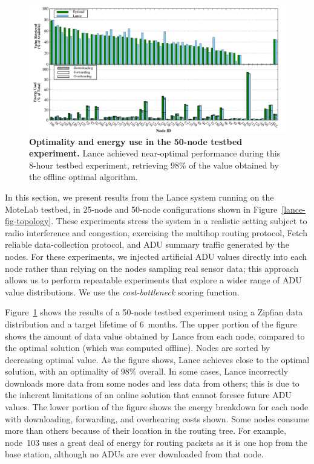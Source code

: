\begin{figure}[t]
\begin{center}
\includegraphics[width=1.0\hsize]{./4-lance/figs/big.pdf}
\end{center}

\caption{\textbf{Optimality and energy use in the 50-node testbed
experiment.} Lance achieved near-optimal performance during this 8-hour
testbed experiment, retrieving 98\% of the value obtained by the offline
optimal algorithm.}

\label{lance-fig-big}
\end{figure}

In this section, we present results from the Lance system running on the
MoteLab testbed, in 25-node and 50-node configurations shown in
Figure~\ref{lance-fig-topology}. These experiments stress the system in a
realistic setting subject to radio interference and congestion, exercising
the multihop routing protocol, Fetch reliable data-collection protocol, and
ADU summary traffic generated by the nodes. For these experiments, we
injected artificial ADU values directly into each node rather than relying on
the nodes sampling real sensor data; this approach allows us to perform
repeatable experiments that explore a wider range of ADU value distributions.
We use the \textit{cost-bottleneck} scoring function.

Figure~\ref{lance-fig-big} shows the results of a 50-node testbed experiment
using a Zipfian data distribution and a target lifetime of 6~months. The
upper portion of the figure shows the amount of data value obtained by Lance
from each node, compared to the optimal solution (which was computed
offline). Nodes are sorted by decreasing optimal value. As the figure shows,
Lance achieves close to the optimal solution, with an optimality of 98\%
overall. In some cases, Lance incorrectly downloads more data from some nodes
and less data from others; this is due to the inherent limitations of an
online solution that cannot foresee future ADU values. The lower portion of
the figure shows the energy breakdown for each node with downloading,
forwarding, and overhearing costs shown. Some nodes consume more than others
because of their location in the routing tree. For example, node~103 uses a
great deal of energy for routing packets as it is one hop from the base
station, although no ADUs are ever downloaded from that node.

